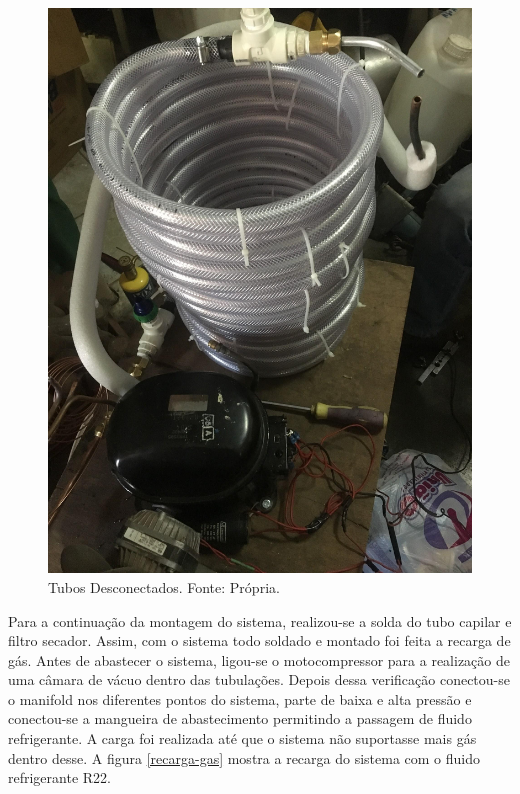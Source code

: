                 \begin{figure}[!htb]
                    \centering
                    \includegraphics[scale= 0.2]{figuras/tubos-desconectados.png}
                    \caption{Tubos Desconectados. Fonte: Própria.}
                    \label{tubos-desconectados}
                \end{figure}

                Para a continuação da montagem do sistema, realizou-se a solda do tubo capilar
                e filtro secador. Assim, com o sistema todo soldado e montado foi feita a recarga de
                gás. Antes de abastecer o sistema, ligou-se o motocompressor para a realização de
                uma câmara de vácuo dentro das tubulações. Depois dessa verificação conectou-se o
                manifold nos diferentes pontos do sistema, parte de baixa e alta pressão e conectou-se
                a mangueira de abastecimento permitindo a passagem de fluido refrigerante. A carga
                foi realizada até que o sistema não suportasse mais gás dentro desse. A figura \ref{recarga-gas} mostra a recarga do sistema com o
                fluido refrigerante R22. 

